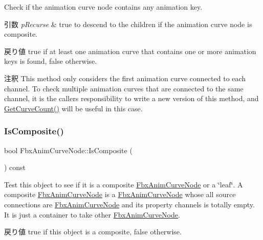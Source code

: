 Check if the animation curve node contains any animation key. 
\begin{DoxyParams}{引数}
{\em p\+Recurse} & {\ttfamily true} to descend to the children if the animation curve node is composite. \\
\hline
\end{DoxyParams}
\begin{DoxyReturn}{戻り値}
{\ttfamily true} if at least one animation curve that contains one or more animation keys is found, {\ttfamily false} otherwise. 
\end{DoxyReturn}
\begin{DoxyRemark}{注釈}
This method only considers the first animation curve connected to each channel. To check multiple animation curves that are connected to the same channel, it is the caller\textquotesingle{}s responsibility to write a new version of this method, and \hyperlink{class_fbx_anim_curve_node_a41d28a650fa90706d1c67ad5f56530b5}{Get\+Curve\+Count()} will be useful in this case. 
\end{DoxyRemark}
\mbox{\label{class_fbx_anim_curve_node_ad0fd9df109fb4e9c8702d37f03b6cc03}} 
\subsubsection{\texorpdfstring{Is\+Composite()}{IsComposite()}}
{\footnotesize\ttfamily bool Fbx\+Anim\+Curve\+Node\+::\+Is\+Composite (\begin{DoxyParamCaption}{ }\end{DoxyParamCaption}) const}

Test this object to see if it is a composite \hyperlink{class_fbx_anim_curve_node}{Fbx\+Anim\+Curve\+Node} or a \char`\"{}leaf\char`\"{}. A composite \hyperlink{class_fbx_anim_curve_node}{Fbx\+Anim\+Curve\+Node} is a \hyperlink{class_fbx_anim_curve_node}{Fbx\+Anim\+Curve\+Node} whose all source connections are \hyperlink{class_fbx_anim_curve_node}{Fbx\+Anim\+Curve\+Node} and its property channels is totally empty. It is just a container to take other \hyperlink{class_fbx_anim_curve_node}{Fbx\+Anim\+Curve\+Node}. \begin{DoxyReturn}{戻り値}
{\ttfamily true} if this object is a composite, {\ttfamily false} otherwise. 
\end{DoxyReturn}
\mbox{\label{class_fbx_anim_curve_node_ad38a2414969d07dd7c1905fb8d07a9b5}} 

